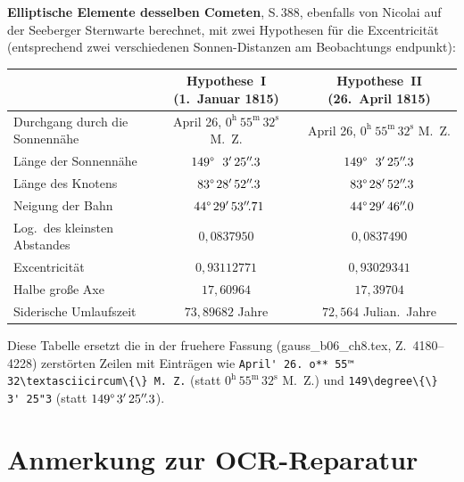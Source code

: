 \documentclass[11pt,a4paper]{article}
\newcommand{\h}{^{\mathrm{h}}}
\newcommand{\m}{^{\mathrm{m}}}
\newcommand{\s}{^{\mathrm{s}}}
\newcommand{\arcmin}{^{\prime}}
\newcommand{\arcsecdec}[1]{^{\prime\prime}\!.#1}   %
\begin{document}
\noindent
\textbf{Elliptische Elemente desselben Cometen}, S.\,388, ebenfalls von Nicolai
auf der Seeberger Sternwarte berechnet, mit zwei Hypothesen f\"ur die
Excentricit\"at (entsprechend zwei verschiedenen Sonnen-Distanzen am Beobachtungs%
endpunkt):

\smallskip
\begin{center}
\begin{tabular}{l c c}
\toprule
                                       & \textbf{Hypothese~I (1.~Januar 1815)} & \textbf{Hypothese~II (26.~April 1815)} \\
\midrule
Durchgang durch die Sonnenn\"ahe       & April 26, $0\h\ 55\m\,32\s$ M.~Z.    & April 26, $0\h\ 55\m\,32\s$ M.~Z.\\
L\"ange der Sonnenn\"ahe               & $149\degree\,\phantom{0}3\arcmin\,25\arcsecdec{3}$ & $149\degree\,\phantom{0}3\arcmin\,25\arcsecdec{3}$\\
L\"ange des Knotens                    & $\phantom{0}83\degree\,28\arcmin\,52\arcsecdec{3}$ & $\phantom{0}83\degree\,28\arcmin\,52\arcsecdec{3}$\\
Neigung der Bahn                       & $\phantom{0}44\degree\,29\arcmin\,53\arcsecdec{71}$ & $\phantom{0}44\degree\,29\arcmin\,46\arcsecdec{0}$\\
Log.\ des kleinsten Abstandes          & $0{,}0837950$ & $0{,}0837490$\\
Excentricit\"at                        & $0{,}93112771$ & $0{,}93029341$\\
Halbe gro\ss e Axe                     & $17{,}60964$  & $17{,}39704$\\
Siderische Umlaufszeit                 & $73{,}89682$ Jahre & $72{,}564$ Julian.\ Jahre\\
\bottomrule
\end{tabular}
\end{center}

\noindent
Diese Tabelle ersetzt die in der fruehere Fassung (gauss\_b06\_ch8.tex, Z.~4180--4228)
zerst\"orten Zeilen mit Eintr\"agen wie
\verb|April' 26. o** 55™ 32\textasciicircum\{\} M. Z.| (statt $0\h\,55\m\,32\s$ M.~Z.) und
\verb|149\degree\{\} 3' 25"3| (statt $149\degree\,3\arcmin\,25\arcsecdec{3}$).

\section*{Anmerkung zur OCR-Reparatur}
\end{document}
